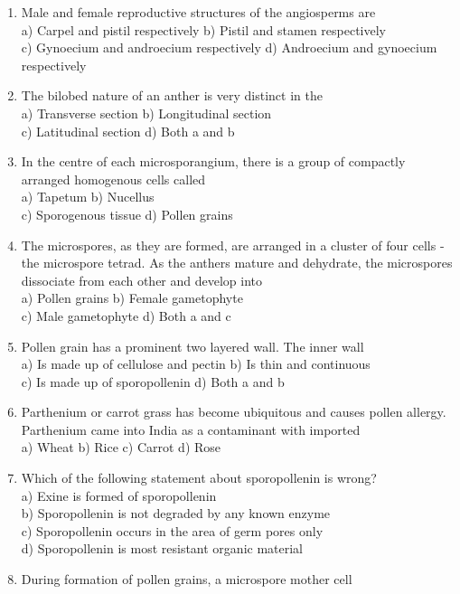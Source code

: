 \begin{enumerate}
\def\labelenumi{\arabic{enumi}.}
\setcounter{enumi}{120}
\item
  Male and female reproductive structures of the angiosperms are\\
  a) Carpel and pistil respectively b) Pistil and stamen respectively\\
  c) Gynoecium and androecium respectively d) Androecium and gynoecium
  respectively
\item
  The bilobed nature of an anther is very distinct in the\\
  a) Transverse section b) Longitudinal section\\
  c) Latitudinal section d) Both a and b
\item
  In the centre of each microsporangium, there is a group of compactly
  arranged homogenous cells called\\
  a) Tapetum b) Nucellus\\
  c) Sporogenous tissue d) Pollen grains
\item
  The microspores, as they are formed, are arranged in a cluster of four
  cells - the microspore tetrad. As the anthers mature and dehydrate,
  the microspores dissociate from each other and develop into\\
  a) Pollen grains b) Female gametophyte\\
  c) Male gametophyte d) Both a and c
\item
  Pollen grain has a prominent two layered wall. The inner wall\\
  a) Is made up of cellulose and pectin b) Is thin and continuous\\
  c) Is made up of sporopollenin d) Both a and b
\item
  Parthenium or carrot grass has become ubiquitous and causes pollen
  allergy. Parthenium came into India as a contaminant with imported\\
  a) Wheat b) Rice c) Carrot d) Rose
\item
  Which of the following statement about sporopollenin is wrong?\\
  a) Exine is formed of sporopollenin\\
  b) Sporopollenin is not degraded by any known enzyme\\
  c) Sporopollenin occurs in the area of germ pores only\\
  d) Sporopollenin is most resistant organic material
\item
  During formation of pollen grains, a microspore mother cell

\end{enumerate}
